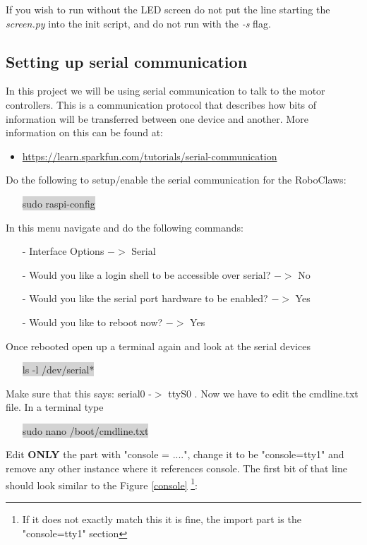 \documentclass[12pt]{article}
\begin{document}
If you wish to run without the LED screen do not put the line starting the \textit{screen.py} into the init script, and do not run with the \textit{-s} flag.

\subsection{Setting up serial communication}	

In this project we will be using serial communication to talk to the motor controllers. This is a communication protocol that describes how bits of information will be transferred between one device and another. More information on this can be found at:
\begin{itemize}
	\item \href{https://learn.sparkfun.com/tutorials/serial-communication}{https://learn.sparkfun.com/tutorials/serial-communication}
\end{itemize}

\noindent Do the following to setup/enable the serial communication for the RoboClaws:
\begin{itemize}
	\item[] \colorbox{lightgray}{sudo raspi-config}
\end{itemize}

\noindent In this menu navigate and do the following commands:
\begin{itemize}
	\item[-]  Interface Options $-> $ Serial 
	\item[-] Would you like a login shell to be accessible over serial? $->$ No
	\item[-] Would you like the serial port hardware to be enabled? $->$ Yes
	\item[-] Would you like to reboot now? $->$ Yes
\end{itemize} 
\noindent Once rebooted open up a terminal again and look at the serial devices	
\begin{itemize}
	\item[] \colorbox{lightgray}{ls -l /dev/serial*}
\end{itemize}
Make sure that this says: serial0 -$>$ ttyS0 . Now we have to edit the cmdline.txt file. In a terminal type
\begin{itemize}
	\item [] \colorbox{lightgray}{sudo nano /boot/cmdline.txt}
\end{itemize}

\noindent Edit \textbf{ONLY} the part with "console = ....", change it to be "console=tty1" and remove any other instance where it references console. The first bit of that line should look similar to the Figure \ref{console} \footnote{If it does not exactly match this it is fine, the import part is the "console=tty1" section}:
\end{document}
